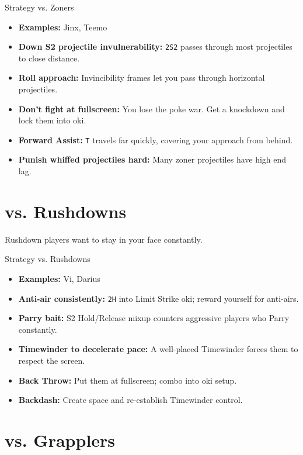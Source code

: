 \documentclass[12pt, a4paper]{report}
\newcommand{\notation}[1]{{\small\texttt{\textcolor{ekkoBlue}{#1}}}}
\begin{document}
\begin{matchupbox}[]{Strategy vs. Zoners}
\begin{itemize}
  \item \textbf{Examples:} Jinx, Teemo
  \item \textbf{Down S2 projectile invulnerability:} \notation{2S2} passes through most projectiles to close distance.
  \item \textbf{Roll approach:} Invincibility frames let you pass through horizontal projectiles.
  \item \textbf{Don't fight at fullscreen:} You lose the poke war. Get a knockdown and lock them into oki.
  \item \textbf{Forward Assist:} \notation{T} travels far quickly, covering your approach from behind.
  \item \textbf{Punish whiffed projectiles hard:} Many zoner projectiles have high end lag.
\end{itemize}
\end{matchupbox}

\section{vs. Rushdowns}

Rushdown players want to stay in your face constantly.

\begin{matchupbox}[]{Strategy vs. Rushdowns}
\begin{itemize}
  \item \textbf{Examples:} Vi, Darius
  \item \textbf{Anti-air consistently:} \notation{2H} into Limit Strike oki; reward yourself for anti-airs.
  \item \textbf{Parry bait:} S2 Hold/Release mixup counters aggressive players who Parry constantly.
  \item \textbf{Timewinder to decelerate pace:} A well-placed Timewinder forces them to respect the screen.
  \item \textbf{Back Throw:} Put them at fullscreen; combo into oki setup.
  \item \textbf{Backdash:} Create space and re-establish Timewinder control.
\end{itemize}
\end{matchupbox}

\section{vs. Grapplers}
\end{document}
